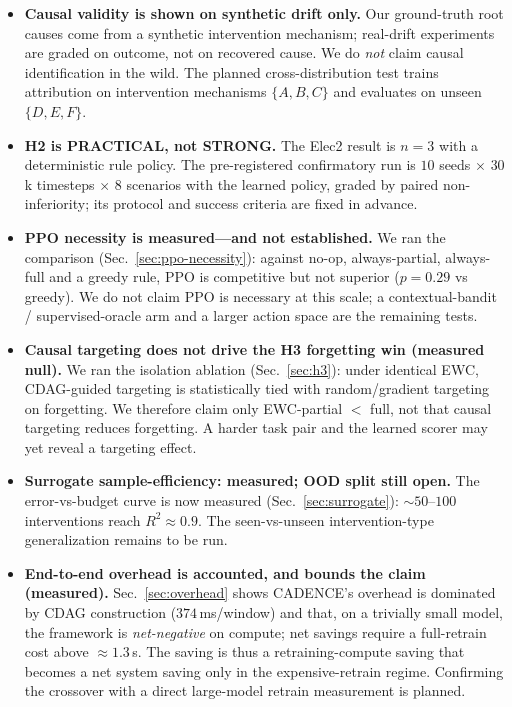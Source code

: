\documentclass[conference]{IEEEtran}
\begin{document}
\begin{itemize}
\item \textbf{Causal validity is shown on synthetic drift only.} Our
ground-truth root causes come from a synthetic intervention mechanism;
real-drift experiments are graded on outcome, not on recovered cause.
We do \emph{not} claim causal identification in the wild. The planned
cross-distribution test trains attribution on intervention mechanisms
$\{A,B,C\}$ and evaluates on unseen $\{D,E,F\}$.
\item \textbf{H2 is PRACTICAL, not STRONG.} The Elec2 result is $n{=}3$
with a deterministic rule policy. The pre-registered confirmatory run is
$10$ seeds $\times$ $30$k timesteps $\times$ $8$ scenarios with the learned
policy, graded by paired non-inferiority; its protocol and success
criteria are fixed in advance.
\item \textbf{PPO necessity is measured---and not established.} We ran the
comparison (Sec.~\ref{sec:ppo-necessity}): against no-op, always-partial,
always-full and a greedy rule, PPO is competitive but not superior
($p=0.29$ vs greedy). We do not claim PPO is necessary at this scale; a
contextual-bandit / supervised-oracle arm and a larger action space are the
remaining tests.
\item \textbf{Causal targeting does not drive the H3 forgetting win (measured null).}
We ran the isolation ablation (Sec.~\ref{sec:h3}): under identical EWC,
CDAG-guided targeting is statistically tied with random/gradient targeting on
forgetting. We therefore claim only EWC-partial $<$ full, not that causal
targeting reduces forgetting. A harder task pair and the learned scorer may
yet reveal a targeting effect.
\item \textbf{Surrogate sample-efficiency: measured; OOD split still open.}
The error-vs-budget curve is now measured (Sec.~\ref{sec:surrogate}):
$\sim\!50$--$100$ interventions reach $R^2\!\approx\!0.9$. The
seen-vs-unseen intervention-type generalization remains to be run.
\item \textbf{End-to-end overhead is accounted, and bounds the claim
(measured).} Sec.~\ref{sec:overhead} shows CADENCE's overhead is dominated by
CDAG construction ($374$\,ms/window) and that, on a trivially small model,
the framework is \emph{net-negative} on compute; net savings require a
full-retrain cost above $\approx1.3$\,s. The saving is thus a
retraining-compute saving that becomes a net system saving only in the
expensive-retrain regime. Confirming the crossover with a direct large-model
retrain measurement is planned.

\end{itemize}
\end{document}
